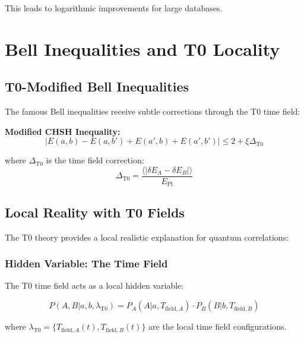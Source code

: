 \documentclass[12pt,a4paper]{article}
\newcommand{\xipar}{\xi}
\newcommand{\deltaE}{\delta E}
\newcommand{\EPlanck}{E_{\text{Pl}}}
\begin{document}
	This leads to logarithmic improvements for large databases.
	
	\section{Bell Inequalities and T0 Locality}
	
	\subsection{T0-Modified Bell Inequalities}
	
	The famous Bell inequalities receive subtle corrections through the T0 time field:
	
	\begin{tcolorbox}[colback=red!5!white,colframe=red!75!black,title={T0 Bell Corrections}]
		\textbf{Modified CHSH Inequality:}
		\begin{equation}
			|E(a,b) - E(a,b') + E(a',b) + E(a',b')| \leq 2 + \xipar \Delta_{\text{T0}}
		\end{equation}
		
		where $\Delta_{\text{T0}}$ is the time field correction:
		\begin{equation}
			\Delta_{\text{T0}} = \frac{\langle|\deltaE_A - \deltaE_B|\rangle}{\EPlanck}
		\end{equation}
	\end{tcolorbox}
	
	\subsection{Local Reality with T0 Fields}
	
	The T0 theory provides a local realistic explanation for quantum correlations:
	
	\subsubsection{Hidden Variable: The Time Field}
	
	The T0 time field acts as a local hidden variable:
	
	\begin{equation}
		P(A,B|a,b,\lambda_{\text{T0}}) = P_A(A|a,T_{\text{field},A}) \cdot P_B(B|b,T_{\text{field},B})
	\end{equation}
	
	where $\lambda_{\text{T0}} = \{T_{\text{field},A}(t), T_{\text{field},B}(t)\}$ are the local time field configurations.
	
\end{document}
